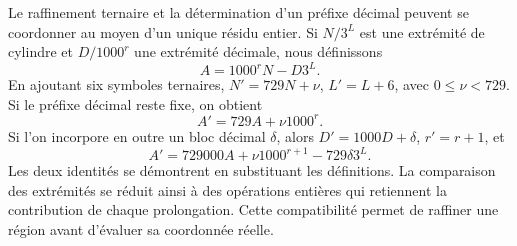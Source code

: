 Le raffinement ternaire et la détermination d'un préfixe décimal
peuvent se coordonner au moyen d'un unique résidu entier. Si \(N/3^L\)
est une extrémité de cylindre et \(D/1000^r\) une extrémité décimale, nous définissons
\[
 A=1000^rN-D3^L.
\]
En ajoutant six symboles ternaires, \(N'=729N+\nu\),
\(L'=L+6\), avec \(0\le\nu<729\). Si le préfixe décimal reste
fixe, on obtient
\[
 A'=729A+\nu1000^r.
\]
Si l'on incorpore en outre un bloc décimal \(\delta\), alors \(D'=1000D+\delta\), \(r'=r+1\), et
\begin{equation}
 A'=729000A+\nu1000^{r+1}-729\delta3^L.
 \label{eq:residuo-dos-bases}
\end{equation}
Les deux identités se démontrent en substituant les définitions. La
comparaison des extrémités se réduit ainsi à des opérations entières qui
retiennent la contribution de chaque prolongation. Cette compatibilité
permet de raffiner une région avant d'évaluer sa coordonnée réelle.
